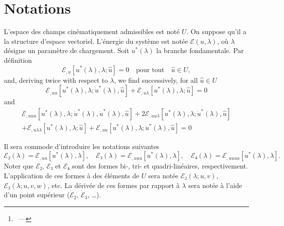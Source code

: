 \documentclass[12pt, final]{scrartcl}
\theoremstyle{definition}
\newcommand{\E}{\mathcal E}
\begin{document}
\title{\sbtitle}
\author{\sbauthor\thanks{\sbaddress~--- \sbemail}}
\maketitle

\section{Notations}

L'espace des champs cinématiquement admissibles est noté $U$. On suppose qu'il
a la structure d'espace vectoriel. L'énergie du système est notée $\E(u, \lambda)$,
où $\lambda$ désigne un paramètre de chargement. Soit $u^{\ast}(\lambda)$ la branche
fondamentale. Par définition
\begin{equation}
  \E_{,u}[u^{\ast}(\lambda), \lambda; \hat{u}]=0 \quad \text{pour tout} \quad \hat{u}\in U,
\end{equation}
and, deriving twice with respect to $\lambda$, we find successively, for all $\hat{u} \in U$
\begin{equation}
  \label{eq:20220901143843}
  \E_{,uu}[u^\ast(\lambda), \lambda; \dot{u}^\ast(\lambda), \hat{u}] + \E_{,u\lambda}[u^\ast(\lambda), \lambda; \hat{u}] = 0
\end{equation}
and
\begin{multline}
  \label{eq:20220901143902}
  \E_{,uuu}[u^\ast(\lambda), \lambda; \dot{u}^\ast(\lambda), \dot{u}^\ast(\lambda), \hat{u}] + 2\E_{,uu\lambda}[u^\ast(\lambda), \lambda; \dot{u}^\ast(\lambda), \hat{u}]\\
  + \E_{,u\lambda\lambda}[u^\ast(\lambda), \lambda; \hat{u}] + \E_{,uu}[u^\ast(\lambda), \lambda; \ddot{u}^\ast(\lambda), \hat{u}] = 0
\end{multline}





Il sera commode d'introduire les notations suivantes
\begin{equation}
  \E₂(\lambda) = \E_{,uu}[u^{\ast}(\lambda), \lambda], \quad \E₃(\lambda) = \E_{,uuu}[u^{\ast}(\lambda), \lambda], \quad \E₄(\lambda) = \E_{,uuuu} [u^{\ast}(\lambda), \lambda].
\end{equation}
Noter que $\E₂$, $\E₃$ et $\E₄$ sont des formes bi-, tri- et
quadri-linéaires, respectivement. L'application de ces formes à des éléments de
$U$ sera notée $\E₂(\lambda; u, v)$, $\E₃(\lambda; u, v, w)$, etc. La dérivée de ces
formes par rapport à $\lambda$ sera notée à l'aide d'un point supérieur
($\dot{\E}_2$, $\dot{\E}_3$, \dots).
\end{document}
